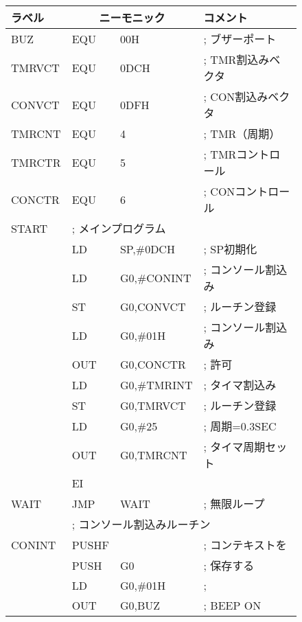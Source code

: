 \begin{figure}[bt]
{\small\tt\begin{center}
\begin{tabular}{|l|l l l|} \hline
ラベル & \multicolumn{2}{|c}{ニーモニック} & コメント\\
\hline
BUZ    & EQU    & 00H               & ; ブザーポート  \\
TMRVCT & EQU    & 0DCH              & ; TMR割込みベクタ  \\
CONVCT & EQU    & 0DFH              & ; CON割込みベクタ  \\
TMRCNT & EQU    & 4                 & ; TMR（周期）  \\
TMRCTR & EQU    & 5                 & ; TMRコントロール  \\
CONCTR & EQU    & 6                 & ; CONコントロール  \\
START  & \multicolumn{3}{|l|}{; メインプログラム}     \\ 
       & LD     & SP,\#0DCH         & ; SP初期化  \\
       & LD     & G0,\#CONINT       & ; コンソール割込み  \\
       & ST     & G0,CONVCT         & ; ルーチン登録  \\
       & LD     & G0,\#01H          & ; コンソール割込み  \\
       & OUT    & G0,CONCTR         & ; 許可  \\
       & LD     & G0,\#TMRINT       & ; タイマ割込み  \\
       & ST     & G0,TMRVCT         & ; ルーチン登録  \\
       & LD     & G0,\#25           & ; 周期=0.3SEC  \\
       & OUT    & G0,TMRCNT         & ; タイマ周期セット  \\
       & EI     &                   &   \\
WAIT   & JMP    & WAIT              & ; 無限ループ  \\
       & \multicolumn{3}{|l|}{; コンソール割込みルーチン}       \\
CONINT & PUSHF  &                   & ; コンテキストを  \\
       & PUSH   & G0                & ; 保存する  \\
       & LD     & G0,\#01H          & ;   \\
       & OUT    & G0,BUZ            & ; BEEP ON  \\

\end{tabular}
\end{center}}
\end{figure}
